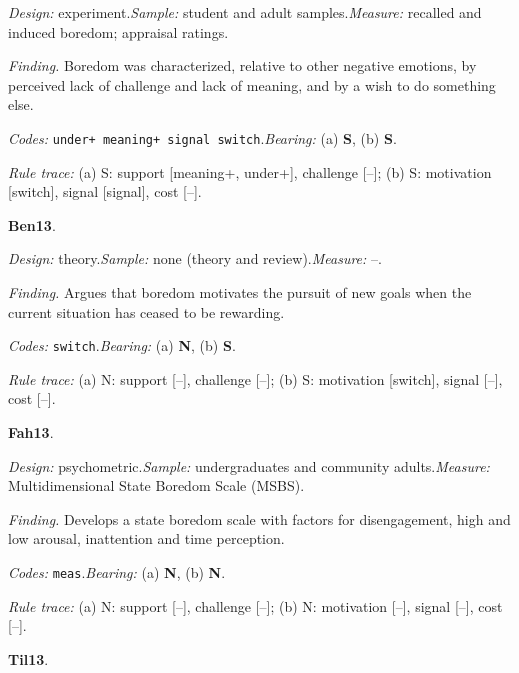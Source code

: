 {\small\noindent\textit{Design:} experiment.\quad \textit{Sample:} student and adult samples.\quad \textit{Measure:} recalled and induced boredom; appraisal ratings.\par
\noindent\textit{Finding.} Boredom was characterized, relative to other negative emotions, by perceived lack of challenge and lack of meaning, and by a wish to do something else.\par
\noindent\textit{Codes:} \texttt{under+ meaning+ signal switch}.\quad \textit{Bearing:} (a) \textbf{S}, (b) \textbf{S}.\par
\noindent\textit{Rule trace:} (a) S: support {[}meaning+, under+{]}, challenge {[}--{]}; (b) S: motivation {[}switch{]}, signal {[}signal{]}, cost {[}--{]}.\par}
\medskip
{}
\noindent\textbf{Ben13}\enspace \citet{BenchLench2013}.\par
{\small\noindent\textit{Design:} theory.\quad \textit{Sample:} none (theory and review).\quad \textit{Measure:} --.\par
\noindent\textit{Finding.} Argues that boredom motivates the pursuit of new goals when the current situation has ceased to be rewarding.\par
\noindent\textit{Codes:} \texttt{switch}.\quad \textit{Bearing:} (a) \textbf{N}, (b) \textbf{S}.\par
\noindent\textit{Rule trace:} (a) N: support {[}--{]}, challenge {[}--{]}; (b) S: motivation {[}switch{]}, signal {[}--{]}, cost {[}--{]}.\par}
\medskip
{}
\noindent\textbf{Fah13}\enspace \citet{Fahlman2013}.\par
{\small\noindent\textit{Design:} psychometric.\quad \textit{Sample:} undergraduates and community adults.\quad \textit{Measure:} Multidimensional State Boredom Scale (MSBS).\par
\noindent\textit{Finding.} Develops a state boredom scale with factors for disengagement, high and low arousal, inattention and time perception.\par
\noindent\textit{Codes:} \texttt{meas}.\quad \textit{Bearing:} (a) \textbf{N}, (b) \textbf{N}.\par
\noindent\textit{Rule trace:} (a) N: support {[}--{]}, challenge {[}--{]}; (b) N: motivation {[}--{]}, signal {[}--{]}, cost {[}--{]}.\par}
\medskip
{}
\noindent\textbf{Til13}\enspace \citet{vanTilburgIgouSedikides2013}.\par

